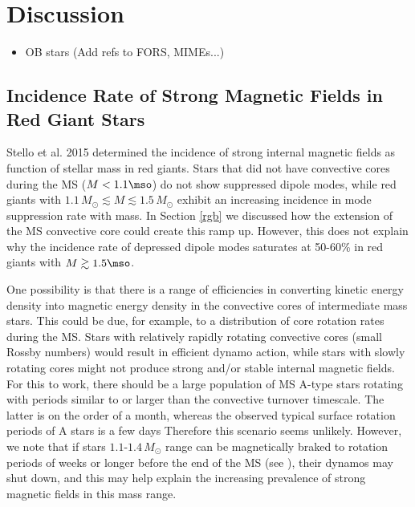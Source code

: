 \section{Discussion}
\begin{itemize}
\item OB stars (Add refs to FORS, MIMEs...)
\end{itemize}

\subsection{Incidence Rate of Strong Magnetic Fields in Red Giant Stars}
Stello et al. 2015 determined the incidence of strong internal magnetic fields as function of stellar mass in red giants. Stars that did not have convective cores during the MS ($M<1.1\mso$) do not show suppressed dipole modes, while red giants with $1.1 \, M_\odot \lesssim M \lesssim 1.5 \, M_\odot$ exhibit an increasing incidence in mode suppression rate with mass. In Section \ref{rgb} we discussed how the extension of the MS convective core could create this ramp up. However, this does not explain why the incidence rate of depressed dipole modes saturates at 50-60\% in red giants with $M \gtrsim 1.5 \mso$.

One possibility is that there is a range of efficiencies in converting kinetic energy density into magnetic energy density in the convective cores of intermediate mass stars. This could be due, for example, to a distribution of core rotation rates during the MS. Stars with relatively rapidly rotating convective cores (small Rossby numbers) would result in efficient dynamo action, while stars with slowly rotating cores might not produce strong and/or stable internal magnetic fields. For this to work, there should be a large population of MS A-type stars rotating with periods similar to or larger than the convective turnover timescale. The latter is on the order of a month, whereas the observed typical surface rotation periods of A stars is a few days \citep{Zorec_2012}
Therefore this scenario seems unlikely. However, we note that if stars $1.1$-$1.4 \, M_\odot$ range can be magnetically braked to rotation periods of weeks or longer before the end of the MS (see \cite{VanSaders_2013}), their dynamos may shut down, and this may help explain the increasing prevalence of strong magnetic fields in this mass range.

